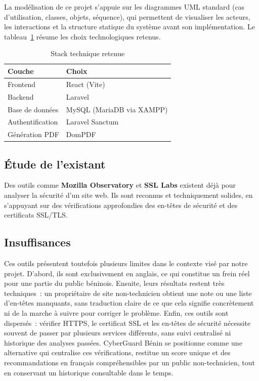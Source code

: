 La mod\'elisation de ce projet s'appuie sur les diagrammes UML standard (cas
d'utilisation, classes, objets, s\'equence), qui permettent de visualiser les
acteurs, les interactions et la structure statique du syst\`eme avant son
impl\'ementation. Le tableau~\ref{tab:stack} r\'esume les choix technologiques
retenus.

\begin{table}[H]
  \centering
  \caption{Stack technique retenue}
  \label{tab:stack}
  \begin{tabular}{ll}
    \toprule
    \textbf{Couche} & \textbf{Choix} \\
    \midrule
    Frontend & React (Vite) \\
    Backend & Laravel \\
    Base de donn\'ees & MySQL (MariaDB via XAMPP) \\
    Authentification & Laravel Sanctum \\
    G\'en\'eration PDF & DomPDF \\
    \bottomrule
  \end{tabular}
\end{table}

\subsection{\'Etude de l'existant}

Des outils comme \textbf{Mozilla Observatory} et \textbf{SSL Labs} existent d\'ej\`a
pour analyser la s\'ecurit\'e d'un site web. Ils sont reconnus et techniquement
solides, en s'appuyant sur des v\'erifications approfondies des en-t\^etes de
s\'ecurit\'e et des certificats SSL/TLS.

\subsection{Insuffisances}

Ces outils pr\'esentent toutefois plusieurs limites dans le contexte vis\'e par
notre projet. D'abord, ils sont exclusivement en anglais, ce qui constitue un
frein r\'eel pour une partie du public b\'eninois. Ensuite, leurs r\'esultats restent
tr\`es techniques~: un propri\'etaire de site non-technicien obtient une note ou une
liste d'en-t\^etes manquants, sans traduction claire de ce que cela signifie
concr\`etement ni de la marche \`a suivre pour corriger le probl\`eme. Enfin, ces
outils sont dispers\'es~: v\'erifier HTTPS, le certificat SSL et les en-t\^etes de
s\'ecurit\'e n\'ecessite souvent de passer par plusieurs services diff\'erents, sans
suivi centralis\'e ni historique des analyses pass\'ees. CyberGuard B\'enin se
positionne comme une alternative qui centralise ces v\'erifications, restitue un
score unique et des recommandations en fran\c{c}ais compr\'ehensibles par un public
non-technicien, tout en conservant un historique consultable dans le temps.


